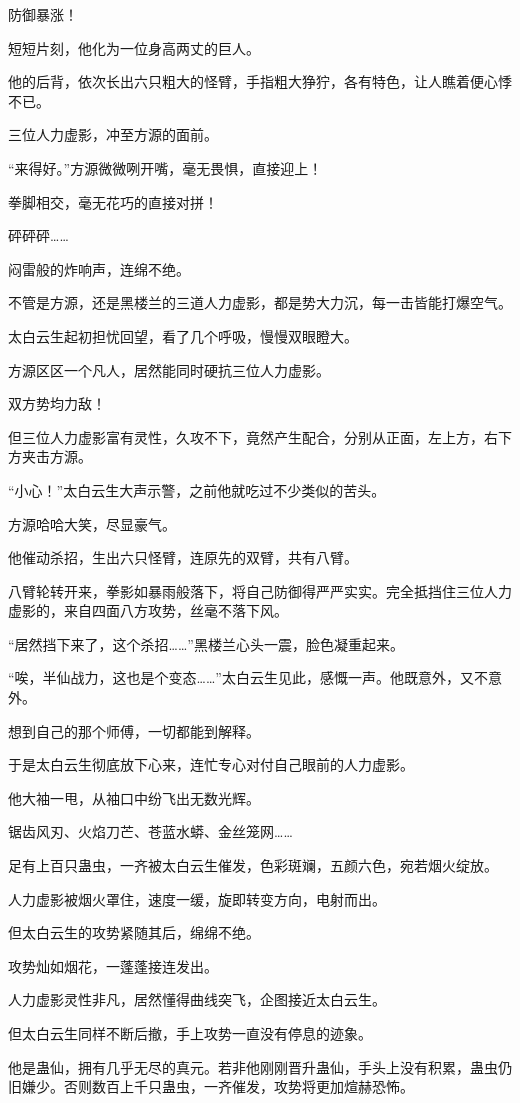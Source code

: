\begin{this_body}
防御暴涨！

短短片刻，他化为一位身高两丈的巨人。

他的后背，依次长出六只粗大的怪臂，手指粗大狰狞，各有特色，让人瞧着便心悸不已。

三位人力虚影，冲至方源的面前。

“来得好。”方源微微咧开嘴，毫无畏惧，直接迎上！

拳脚相交，毫无花巧的直接对拼！

砰砰砰……

闷雷般的炸响声，连绵不绝。

不管是方源，还是黑楼兰的三道人力虚影，都是势大力沉，每一击皆能打爆空气。

太白云生起初担忧回望，看了几个呼吸，慢慢双眼瞪大。

方源区区一个凡人，居然能同时硬抗三位人力虚影。

双方势均力敌！

但三位人力虚影富有灵性，久攻不下，竟然产生配合，分别从正面，左上方，右下方夹击方源。

“小心！”太白云生大声示警，之前他就吃过不少类似的苦头。

方源哈哈大笑，尽显豪气。

他催动杀招，生出六只怪臂，连原先的双臂，共有八臂。

八臂轮转开来，拳影如暴雨般落下，将自己防御得严严实实。完全抵挡住三位人力虚影的，来自四面八方攻势，丝毫不落下风。

“居然挡下来了，这个杀招……”黑楼兰心头一震，脸色凝重起来。

“唉，半仙战力，这也是个变态……”太白云生见此，感慨一声。他既意外，又不意外。

想到自己的那个师傅，一切都能到解释。

于是太白云生彻底放下心来，连忙专心对付自己眼前的人力虚影。

他大袖一甩，从袖口中纷飞出无数光辉。

锯齿风刃、火焰刀芒、苍蓝水蟒、金丝笼网……

足有上百只蛊虫，一齐被太白云生催发，色彩斑斓，五颜六色，宛若烟火绽放。

人力虚影被烟火罩住，速度一缓，旋即转变方向，电射而出。

但太白云生的攻势紧随其后，绵绵不绝。

攻势灿如烟花，一蓬蓬接连发出。

人力虚影灵性非凡，居然懂得曲线突飞，企图接近太白云生。

但太白云生同样不断后撤，手上攻势一直没有停息的迹象。

他是蛊仙，拥有几乎无尽的真元。若非他刚刚晋升蛊仙，手头上没有积累，蛊虫仍旧嫌少。否则数百上千只蛊虫，一齐催发，攻势将更加煊赫恐怖。


\end{this_body}
